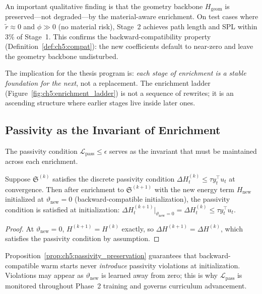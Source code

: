 An important qualitative finding is that the geometry backbone
$H_{\mathrm{geom}}$ is preserved—not degraded—by the material-aware
enrichment.
On test cases where $\tilde{r} \approx 0$ and $\phi \gg 0$ (no material
risk), Stage~2 achieves path length and SPL within 3\% of Stage~1.
This confirms the backward-compatibility property
(Definition~\ref{def:ch5:compat}): the new coefficients default to near-zero
and leave the geometry backbone undisturbed.

The implication for the thesis program is:
\emph{each stage of enrichment is a stable foundation for the next},
not a replacement.
The enrichment ladder (Figure~\ref{fig:ch5:enrichment_ladder}) is not
a sequence of rewrites; it is an ascending structure where earlier stages
live inside later ones.

\subsection{Passivity as the Invariant of Enrichment}
\label{subsec:ch5:passivity}

The passivity condition $\mathcal{L}_{\mathrm{pass}} \leq \epsilon$
serves as the invariant that must be maintained across each enrichment.

\begin{proposition}
\label{prop:ch5:passivity_preservation}
Suppose $\mathfrak{S}^{(k)}$ satisfies the discrete passivity condition
$\Delta H^{(k)}_t \leq \tau y_t^\top u_t$ at convergence.
Then after enrichment to $\mathfrak{S}^{(k+1)}$ with the new energy
term $H_{\mathrm{new}}$ initialized at $\vartheta_{\mathrm{new}} = 0$
(backward-compatible initialization), the passivity condition is
satisfied at initialization:
$\Delta H^{(k+1)}_t\big|_{\vartheta_{\mathrm{new}}=0}
= \Delta H^{(k)}_t \leq \tau y_t^\top u_t$.
\end{proposition}

\begin{proof}
At $\vartheta_{\mathrm{new}} = 0$, $H^{(k+1)} = H^{(k)}$ exactly,
so $\Delta H^{(k+1)} = \Delta H^{(k)}$, which satisfies the passivity
condition by assumption.
\end{proof}

Proposition~\ref{prop:ch5:passivity_preservation} guarantees that
backward-compatible warm starts never \emph{introduce} passivity
violations at initialization.
Violations may appear as $\vartheta_{\mathrm{new}}$ is learned away
from zero; this is why $\mathcal{L}_{\mathrm{pass}}$ is monitored
throughout Phase~2 training and governs curriculum advancement.

